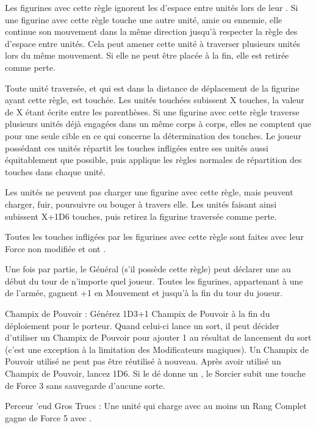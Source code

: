 
Les figurines avec cette règle ignorent les  d'espace entre unités lors de leur \randommovement{}. Si une figurine avec cette règle touche une autre unité, amie ou ennemie, elle continue son mouvement dans la même direction jusqu'à respecter la règle des  d'espace entre unités. Cela peut amener cette unité à traverser plusieurs unités lors du même mouvement. Si elle ne peut être placée à la fin, elle est retirée comme perte.

Toute unité traversée, et qui est dans la distance de déplacement de la figurine ayant cette règle, est touchée. Les unités touchées subissent X touches, la valeur de X étant écrite entre les parenthèses. Si une figurine avec cette règle traverse plusieurs unités déjà engagées dans un même corps à corps, elles ne comptent que pour une seule cible en ce qui concerne la détermination des touches. Le joueur possédant ces unités répartit les touches infligées entre ses unités aussi équitablement que possible, puis applique les règles normales de répartition des touches dans chaque unité.

Les unités ne peuvent pas charger une figurine avec cette règle, mais peuvent charger, fuir, poursuivre ou bouger à travers elle. Les unités faisant ainsi subissent X+1D6 touches, puis retirez la figurine traversée comme perte.

Toutes les touches infligées par les figurines avec cette règle sont faites avec leur Force non modifiée et ont .


\armyspecialruleentry{\waaargh}

Une fois par partie, le Général (s'il possède cette règle) peut déclarer une \waaargh au début du tour de n'importe quel joueur. Toutes les figurines, appartenant à une \greenhideraces de l'armée, gagnent +1 en Mouvement et \swiftstride jusqu'à la fin du tour du joueur.


\armyarmoury

\begin{customdescription}
	\item[Champix de Pouvoir :] Générez 1D3+1 Champix de Pouvoir à la fin du déploiement pour le porteur. Quand celui-ci lance un sort, il peut décider d'utiliser un Champix de Pouvoir pour ajouter 1 au résultat de lancement du sort (c'est une exception à la limitation des Modificateurs magiques). Un Champix de Pouvoir utilisé ne peut pas être réutilisé à nouveau. Après avoir utilisé un Champix de Pouvoir, lancez 1D6. Si le dé donne un , le Sorcier subit une touche de Force 3 sans sauvegarde d'aucune sorte.
	\item[Perceur 'eud Gros Trucs :] Une unité qui charge avec au moins un Rang Complet gagne  de Force 5 avec \multiplewounds{\ordnance}{\largetarget}.
\end{customdescription}


